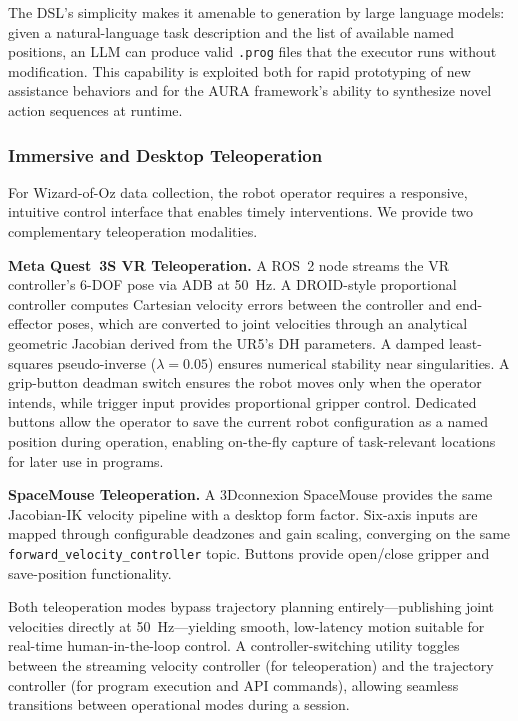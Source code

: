 \documentclass[sensors,article,submit,pdftex,moreauthors]{Definitions/mdpi}
\begin{document}
The DSL's simplicity makes it amenable to generation by large language models: given a natural-language task description and the list of available named positions, an LLM can produce valid \texttt{.prog} files that the executor runs without modification. This capability is exploited both for rapid prototyping of new assistance behaviors and for the AURA framework's ability to synthesize novel action sequences at runtime.

\subsubsection{Immersive and Desktop Teleoperation}

For Wizard-of-Oz data collection, the robot operator requires a responsive, intuitive control interface that enables timely interventions. We provide two complementary teleoperation modalities.

\textbf{Meta Quest~3S VR Teleoperation.} A ROS~2 node streams the VR controller's 6-DOF pose via ADB at 50~Hz. A DROID-style proportional controller computes Cartesian velocity errors between the controller and end-effector poses, which are converted to joint velocities through an analytical geometric Jacobian derived from the UR5's DH parameters. A damped least-squares pseudo-inverse ($\lambda = 0.05$) ensures numerical stability near singularities. A grip-button deadman switch ensures the robot moves only when the operator intends, while trigger input provides proportional gripper control. Dedicated buttons allow the operator to save the current robot configuration as a named position during operation, enabling on-the-fly capture of task-relevant locations for later use in programs.

\textbf{SpaceMouse Teleoperation.} A 3Dconnexion SpaceMouse provides the same Jacobian-IK velocity pipeline with a desktop form factor. Six-axis inputs are mapped through configurable deadzones and gain scaling, converging on the same \texttt{forward\_velocity\_controller} topic. Buttons provide open/close gripper and save-position functionality.

Both teleoperation modes bypass trajectory planning entirely---publishing joint velocities directly at 50~Hz---yielding smooth, low-latency motion suitable for real-time human-in-the-loop control. A controller-switching utility toggles between the streaming velocity controller (for teleoperation) and the trajectory controller (for program execution and API commands), allowing seamless transitions between operational modes during a session.
\end{document}
